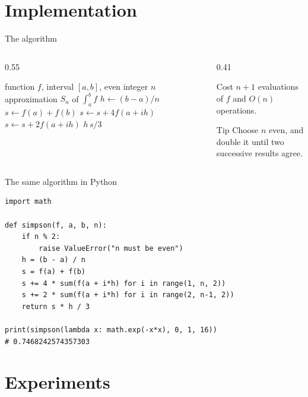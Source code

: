 \documentclass[aspectratio=169,11pt]{beamer}
\begin{document}
\section{Implementation}

\begin{frame}{The algorithm}
  \begin{columns}[T]
    \begin{column}{0.55\textwidth}
      \begin{algorithmic}[1]
        \Require function $f$, interval $[a,b]$, even integer $n$
        \Ensure approximation $S_n$ of $\int_a^b f$
        \State $h \gets (b-a)/n$
        \State $s \gets f(a)+f(b)$
            \State $s \gets s+4f(a+ih)$
          \Else
            \State $s \gets s+2f(a+ih)$
          \EndIf
        \EndFor
        \State \Return $h\,s/3$
      \end{algorithmic}
    \end{column}
    \begin{column}{0.41\textwidth}
      \begin{block}{Cost}
        $n+1$ evaluations of $f$ and $O(n)$ operations.
      \end{block}
      \begin{exampleblock}{Tip}
        Choose $n$ even, and double it until two successive results agree.
      \end{exampleblock}
    \end{column}
  \end{columns}
\end{frame}

\begin{frame}[fragile]{The same algorithm in Python}
\begin{lstlisting}
import math

def simpson(f, a, b, n):
    if n % 2:
        raise ValueError("n must be even")
    h = (b - a) / n
    s = f(a) + f(b)
    s += 4 * sum(f(a + i*h) for i in range(1, n, 2))
    s += 2 * sum(f(a + i*h) for i in range(2, n-1, 2))
    return s * h / 3

print(simpson(lambda x: math.exp(-x*x), 0, 1, 16))
# 0.7468242574357303
\end{lstlisting}
\end{frame}

\section{Experiments}
\end{document}
